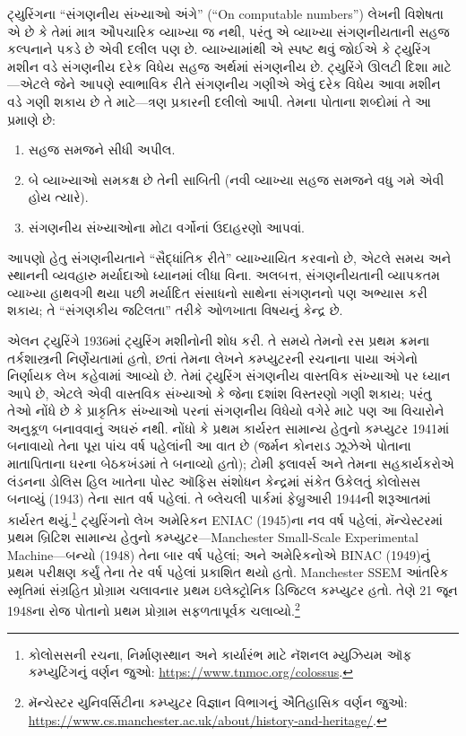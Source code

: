 \begin{digress}
ટ્યુરિંગના ``સંગણનીય સંખ્યાઓ અંગે'' (``On computable numbers'') લેખની
વિશેષતા એ છે કે તેમાં
માત્ર ઔપચારિક વ્યાખ્યા જ નથી, પરંતુ એ વ્યાખ્યા સંગણનીયતાની
સહજ કલ્પનાને પકડે છે એવી દલીલ પણ છે. વ્યાખ્યામાંથી એ સ્પષ્ટ
થવું જોઈએ કે ટ્યુરિંગ મશીન વડે સંગણનીય દરેક વિધેય સહજ અર્થમાં
સંગણનીય છે. ટ્યુરિંગે ઊલટી દિશા માટે---એટલે જેને આપણે
સ્વાભાવિક રીતે સંગણનીય ગણીએ એવું દરેક વિધેય આવા મશીન વડે
ગણી શકાય છે તે માટે---ત્રણ પ્રકારની દલીલો આપી. તેમના પોતાના
શબ્દોમાં તે આ પ્રમાણે છે:
\begin{enumerate}
\item સહજ સમજને સીધી અપીલ.
\item બે વ્યાખ્યાઓ સમકક્ષ છે તેની સાબિતી (નવી વ્યાખ્યા સહજ
  સમજને વધુ ગમે એવી હોય ત્યારે).
\item સંગણનીય સંખ્યાઓના મોટા વર્ગોનાં ઉદાહરણો આપવાં.
\end{enumerate}
આપણો હેતુ સંગણનીયતાને ``સૈદ્ધાંતિક રીતે'' વ્યાખ્યાયિત કરવાનો
છે, એટલે સમય અને સ્થાનની વ્યવહારુ મર્યાદાઓ ધ્યાનમાં લીધા
વિના. અલબત્ત, સંગણનીયતાની વ્યાપકતમ વ્યાખ્યા હાથવગી થયા
પછી મર્યાદિત સંસાધનો સાથેના સંગણનનો પણ અભ્યાસ કરી શકાય;
તે ``સંગણકીય જટિલતા'' તરીકે ઓળખાતા વિષયનું કેન્દ્ર છે.
\end{digress}

\begin{history}
એલન ટ્યુરિંગે 1936માં ટ્યુરિંગ મશીનોની શોધ કરી. તે સમયે તેમનો
રસ પ્રથમ ક્રમના તર્કશાસ્ત્રની નિર્ણેયતામાં હતો, છતાં તેમના
લેખને કમ્પ્યુટરની રચનાના પાયા અંગેનો નિર્ણાયક લેખ કહેવામાં
આવ્યો છે. તેમાં ટ્યુરિંગ સંગણનીય વાસ્તવિક સંખ્યાઓ પર ધ્યાન
આપે છે, એટલે એવી વાસ્તવિક સંખ્યાઓ કે જેના દશાંશ વિસ્તરણો
ગણી શકાય; પરંતુ તેઓ નોંધે છે કે પ્રાકૃતિક સંખ્યાઓ પરનાં
સંગણનીય વિધેયો વગેરે માટે પણ આ વિચારોને અનુકૂળ બનાવવાનું
અઘરું નથી. નોંધો કે પ્રથમ કાર્યરત સામાન્ય હેતુનો કમ્પ્યુટર
1941માં બનાવાયો તેના પૂરા પાંચ વર્ષ પહેલાંની આ વાત છે
(જર્મન કોનરાડ ઝૂઝેએ પોતાના માતાપિતાના ઘરના બેઠકખંડમાં તે
બનાવ્યો હતો); ટોમી ફ્લાવર્સ અને તેમના સહકાર્યકરોએ લંડનના
ડોલિસ હિલ ખાતેના પોસ્ટ ઑફિસ સંશોધન કેન્દ્રમાં સંકેત ઉકેલતું
કોલોસસ બનાવ્યું (1943) તેના સાત વર્ષ પહેલાં. તે બ્લેચલી પાર્કમાં
ફેબ્રુઆરી 1944ની શરૂઆતમાં કાર્યરત થયું.\footnote{કોલોસસની રચના,
નિર્માણસ્થાન અને કાર્યારંભ માટે નૅશનલ મ્યુઝિયમ ઑફ કમ્પ્યુટિંગનું
વર્ણન જુઓ: \url{https://www.tnmoc.org/colossus}.}
ટ્યુરિંગનો લેખ અમેરિકન ENIAC (1945)ના નવ વર્ષ પહેલાં,
મૅન્ચેસ્ટરમાં પ્રથમ
બ્રિટિશ સામાન્ય હેતુનો કમ્પ્યુટર---Manchester Small-Scale
Experimental Machine---બન્યો (1948) તેના બાર વર્ષ પહેલાં;
અને અમેરિકનોએ BINAC (1949)નું પ્રથમ પરીક્ષણ કર્યું તેના તેર
વર્ષ પહેલાં પ્રકાશિત થયો હતો. Manchester SSEM આંતરિક સ્મૃતિમાં સંગ્રહિત
પ્રોગ્રામ ચલાવનાર પ્રથમ ઇલેક્ટ્રોનિક ડિજિટલ કમ્પ્યુટર હતો.
તેણે 21 જૂન 1948ના રોજ પોતાનો પ્રથમ પ્રોગ્રામ સફળતાપૂર્વક
ચલાવ્યો.\footnote{મૅન્ચેસ્ટર યુનિવર્સિટીના કમ્પ્યુટર વિજ્ઞાન
વિભાગનું ઐતિહાસિક વર્ણન જુઓ:
\url{https://www.cs.manchester.ac.uk/about/history-and-heritage/}.}
\end{history}

